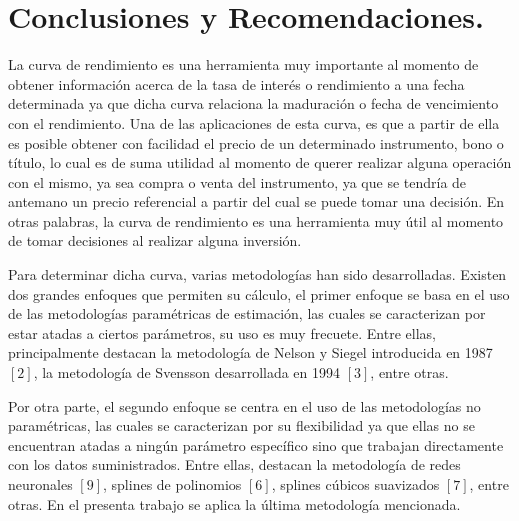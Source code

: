 \section{Conclusiones y Recomendaciones.\\}

\hspace{0.4cm}La curva de rendimiento es una herramienta muy importante al momento de obtener informaci\'on acerca de la tasa de inter\'es o rendimiento a una fecha determinada ya que dicha curva relaciona la maduraci\'on o fecha de vencimiento con el rendimiento. Una de las aplicaciones de esta curva, es que a partir de ella es posible obtener con facilidad el precio de un determinado instrumento, bono o t\'itulo, lo cual es de suma utilidad al momento de querer realizar alguna operaci\'on con el mismo, ya sea compra o venta del instrumento, ya que se tendr\'ia de antemano un precio referencial a partir del cual se puede tomar una decisi\'on. En otras palabras, la curva de rendimiento es una herramienta muy \'util al momento de tomar decisiones al realizar alguna inversi\'on.

\vspace{0.5cm}

\hspace{0.4cm} Para determinar dicha curva, varias metodolog\'ias han sido desarrolladas. Existen dos grandes enfoques que permiten su c\'alculo, el primer enfoque se basa en el uso de las metodolog\'ias param\'etricas de estimaci\'on, las cuales se caracterizan por estar atadas a ciertos par\'ametros, su uso es muy frecuete. Entre ellas, principalmente destacan la metodolog\'ia de Nelson y Siegel introducida en 1987 $[2]$, la metodolog\'ia de Svensson desarrollada en 1994 $[3]$, entre otras.

\vspace{0.5cm}

\hspace{0.4cm}Por otra parte, el segundo enfoque se centra en el uso de las metodolog\'ias no param\'etricas, las cuales se caracterizan por su flexibilidad ya que ellas no se encuentran atadas a ning\'un par\'ametro espec\'ifico sino que trabajan directamente con los datos suministrados. Entre ellas, destacan la metodolog\'ia de redes neuronales $[9]$, splines de polinomios $[6]$, splines c\'ubicos suavizados $[7]$, entre otras. En el presenta trabajo se aplica la \'ultima metodolog\'ia mencionada.

\vspace{0.5cm}

